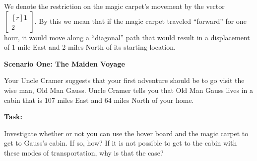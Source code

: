 \documentclass{problemset}
\newcommand{\mat}[1]{\begin{bmatrix*}[r]#1\end{bmatrix*}}
\begin{document}
\begin{iola}
\begin{minipage}{\textwidth}
	We denote the restriction on the magic carpet's movement by the vector
	$\mat{1 \\2 }$. By this we mean that if the
	magic carpet traveled ``forward'' for one hour, it would move along a
	``diagonal'' path that would result in a displacement of 1 mile East and
	2 miles North of its starting location.
\end{minipage}


\vspace{10mm}

\textbf{Scenario One: The Maiden Voyage}

Your Uncle Cramer suggests that your first adventure should be to go visit
the wise man, Old Man Gauss. Uncle Cramer tells you that Old Man Gauss
lives in a cabin that is 107 miles East and 64 miles North of your home.

\vspace{5mm}

\textbf{Task:}
\par
Investigate whether or not you can use the hover board and the magic
carpet to get to Gauss's cabin. If so, how? If it is not possible to
get to the cabin with these modes of transportation, why is that the case?

\end{iola}
\end{document}
